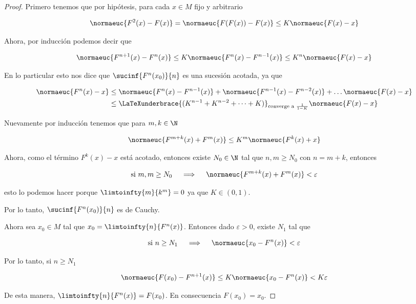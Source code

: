 \begin{proof}
    Primero tenemos que por hipótesis, para cada $x \in M$ fijo y arbitrario
    
    \[
    \normaeuc{F^2(x) - F(x)} = \normaeuc{F(F(x)) - F(x)} \leq K\normaeuc{F(x) - x}
    \]
    
    Ahora, por inducción podemos decir que
    
    \[
    \normaeuc{F^{n+1}(x) - F^n(x)} \leq K\normaeuc{F^n(x) - F^{n-1}(x)} \leq K^n\normaeuc{F(x) - x}
    \]
    
    En lo particular esto nos dice que $\sucinf{F^n(x_0)}{n}$ es una sucesión acotada, ya que
    
    \begin{align*}
        \normaeuc{F^n(x) - x} &\leq \normaeuc{F^n(x) - F^{n-1}(x)} + \normaeuc{F^{n-1}(x) - F^{n-2}(x)} + \dots \normaeuc{F(x) - x} \\
            &\leq \LaTeXunderbrace{(K^{n-1} + K^{n-2} + \dots + K)}_{\text{converge a $\frac{1}{1-K}$}}\normaeuc{F(x) - x}
    \end{align*}
    
    Nuevamente por inducción tenemos que para $m,k \in \N$
    
    \[
    \normaeuc{F^{m+k}(x) + F^m(x)} \leq K^m\normaeuc{F^k(x) + x}
    \]
    
    Ahora, como el término $F^k(x) - x$ está acotado, entonces existe $N_0 \in \N$ tal que $n,m \geq N_0$ con $n = m+k$, entonces
    
    \[
    \text{si $m,m \geq N_0$} \quad \implies \quad \normaeuc{F^{m+k}(x) + F^m(x)} < \varepsilon
    \]
    
    \noindent esto lo podemos hacer porque $\limtoinfty{m}{k^m} = 0$ ya que $K \in (0,1)$.
    
    Por lo tanto, $\sucinf{F^n(x_0)}{n}$ es de Cauchy.
    
    Ahora sea $x_0 \in M$ tal que $x_0 = \limtoinfty{n}{F^n(x)}$. Entonces dado $\varepsilon > 0$, existe $N_1$ tal que
    
    \[
    \text{si $n \geq N_1$} \quad \implies \quad \normaeuc{x_0 - F^n(x)} < \varepsilon
    \]
    
    Por lo tanto, si $n \geq N_1$
    
    \[
    \normaeuc{F(x_0) - F^{n+1}(x)} \leq K\normaeuc{x_0 - F^n(x)} < K\varepsilon
    \]
    
    De esta manera, $\limtoinfty{n}{F^n(x)} = F(x_0)$. En consecuencia $F(x_0) = x_0$.
    

\end{proof}
